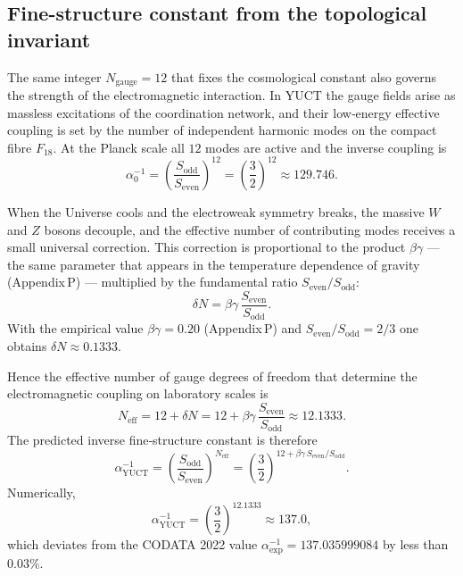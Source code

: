 \documentclass[12pt,a4paper]{article}
\begin{document}
	\subsection{Fine-structure constant from the topological invariant}
	
	The same integer \(N_{\mathrm{gauge}} = 12\) that fixes the cosmological constant also governs the strength of the electromagnetic interaction.  
	In YUCT the gauge fields arise as massless excitations of the coordination network, and their low‑energy effective coupling is set by the number of independent harmonic modes on the compact fibre \(F_{18}\).  
	At the Planck scale all \(12\) modes are active and the inverse coupling is
	\begin{equation}
		\alpha_0^{-1} = \left( \frac{S_{\mathrm{odd}}}{S_{\mathrm{even}}} \right)^{12}
		= \left( \frac{3}{2} \right)^{12} \approx 129.746 .
	\end{equation}
	
	When the Universe cools and the electroweak symmetry breaks, the massive \(W\) and \(Z\) bosons decouple, and the effective number of contributing modes receives a small universal correction.  
	This correction is proportional to the product \(\beta\gamma\) — the same parameter that appears in the temperature dependence of gravity (Appendix P) — multiplied by the fundamental ratio \(S_{\mathrm{even}}/S_{\mathrm{odd}}\):
	\begin{equation}
		\delta N = \beta\gamma \, \frac{S_{\mathrm{even}}}{S_{\mathrm{odd}}} .
		\label{eq:deltaN}
	\end{equation}
	With the empirical value \(\beta\gamma = 0.20\) (Appendix P) and \(S_{\mathrm{even}}/S_{\mathrm{odd}} = 2/3\) one obtains \(\delta N \approx 0.1333\).
	
	Hence the effective number of gauge degrees of freedom that determine the electromagnetic coupling on laboratory scales is
	\begin{equation}
		N_{\mathrm{eff}} = 12 + \delta N = 12 + \beta\gamma\,\frac{S_{\mathrm{even}}}{S_{\mathrm{odd}}} \approx 12.1333 .
	\end{equation}
	The predicted inverse fine‑structure constant is therefore
	\begin{equation}
		\boxed{\alpha^{-1}_{\mathrm{YUCT}} = \left( \frac{S_{\mathrm{odd}}}{S_{\mathrm{even}}} \right)^{N_{\mathrm{eff}}}
			= \left( \frac{3}{2} \right)^{12 + \beta\gamma\,S_{\mathrm{even}}/S_{\mathrm{odd}}} } .
		\label{eq:alphaYUCT}
	\end{equation}
	Numerically,
	\[
	\alpha^{-1}_{\mathrm{YUCT}} = \left( \frac{3}{2} \right)^{12.1333} \approx 137.0 ,
	\]
	which deviates from the CODATA 2022 value \(\alpha^{-1}_{\mathrm{exp}} = 137.035999084\) by less than \(0.03\%\).
	
\end{document}

